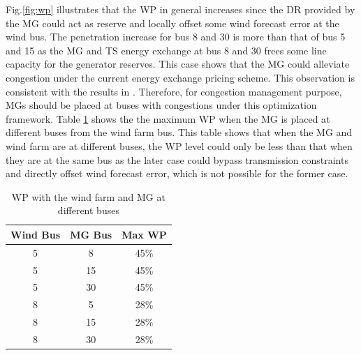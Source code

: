 Fig.\ref{fig:wp} illustrates that the WP in general increases since the DR provided by the MG could act as reserve and locally offset some wind forecast error at the wind bus. The penetration increase for bus 8 and 30 is more than that of bus 5 and 15 as the MG and TS energy exchange at bus 8 and 30 frees some line capacity for the generator reserves. This case shows that the MG could alleviate congestion under the current energy exchange pricing scheme. This observation is consistent with the results in \cite{liu2016quantifying}. Therefore, for congestion management purpose, MGs should be placed at buses with congestions under this optimization framework.
Table \ref{transbuss} shows the the maximum WP when the MG is placed at different buses from the wind farm bus. This table shows that when the MG and wind farm are at different buses, the  WP level could only be less than that when they are at the same bus as the later case could bypass transmission constraints and directly offset wind forecast error, which is not possible for the former case. 

\begin{table}[H]
\centering
\begin{tabular}{ |c|c|c| } 
 \hline
 Wind Bus & MG Bus & Max WP \\ 
 \hline
5 & 8 & 45\% \\ 
 \hline
5 & 15 & 45\% \\ 
 \hline
5 & 30 & 45\% \\ 
 \hline
8 & 5 & 28\%\\ 
 \hline
8 & 15 & 28\% \\ 
 \hline
8 & 30 & 28\% \\ 
 \hline
\end{tabular}
\caption{ WP with the wind farm and MG at different buses}
 \label{transbuss}
\end{table}



